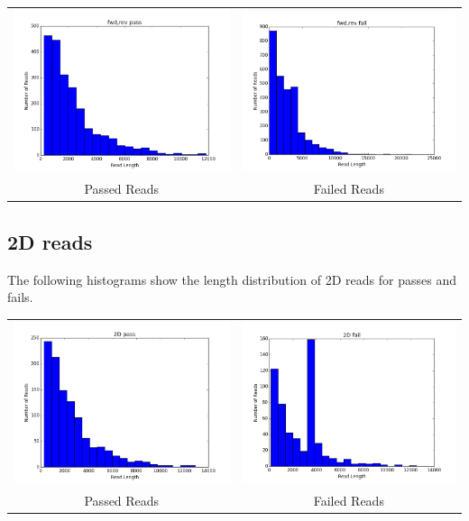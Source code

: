 \documentclass[11pt]{article}
\begin{document}
        \begin{tabular}{cc}
          \includegraphics[width=.48\textwidth]{1Dpasses}
          &
          \includegraphics[width=.48\textwidth]{1Dfailures}
          \\
          Passed Reads
          &
          Failed Reads
        \end{tabular}
        

\subsection*{2D reads}

        The following histograms show the length distribution of 2D reads for passes and fails.

        
        \begin{tabular}{cc}
          \includegraphics[width=.48\textwidth]{2Dpasses}
          &
          \includegraphics[width=.48\textwidth]{2Dfailures}
          \\
          Passed Reads
          &
          Failed Reads
        \end{tabular}
\end{document}
